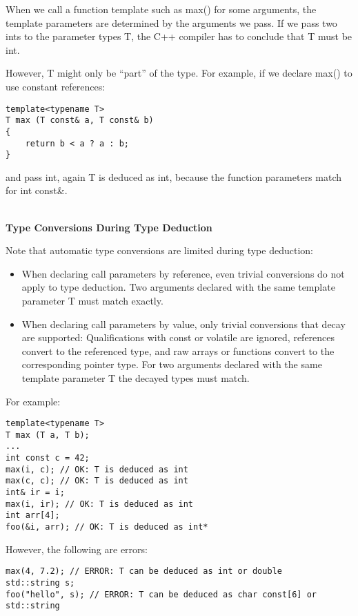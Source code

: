 When we call a function template such as max() for some arguments, the template parameters are determined by the arguments we pass. If we pass two ints to the parameter types T, the C++ compiler has to conclude that T must be int.

However, T might only be “part” of the type. For example, if we declare max() to use constant references:

\begin{lstlisting}[style=styleCXX]
template<typename T>
T max (T const& a, T const& b)
{
	return b < a ? a : b;
}
\end{lstlisting}

and pass int, again T is deduced as int, because the function parameters match for int const\&.

\hspace*{\fill} \\ %
\noindent
\textbf{Type Conversions During Type Deduction}

Note that automatic type conversions are limited during type deduction:

\begin{itemize}
\item
When declaring call parameters by reference, even trivial conversions do not apply to type deduction. Two arguments declared with the same template parameter T must match exactly.

\item
When declaring call parameters by value, only trivial conversions that decay are supported: Qualifications with const or volatile are ignored, references convert to the referenced type, and raw arrays or functions convert to the corresponding pointer type. For two arguments declared with the same template parameter T the decayed types must match.
\end{itemize}

For example:

\begin{lstlisting}[style=styleCXX]
template<typename T>
T max (T a, T b);
...
int const c = 42;
max(i, c); // OK: T is deduced as int
max(c, c); // OK: T is deduced as int
int& ir = i;
max(i, ir); // OK: T is deduced as int
int arr[4];
foo(&i, arr); // OK: T is deduced as int*
\end{lstlisting}

However, the following are errors:

\begin{lstlisting}[style=styleCXX]
max(4, 7.2); // ERROR: T can be deduced as int or double
std::string s;
foo("hello", s); // ERROR: T can be deduced as char const[6] or std::string
\end{lstlisting}

